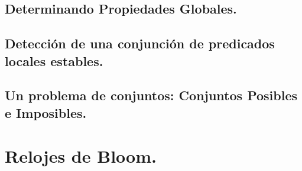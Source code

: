 \documentclass[9pt]{beamer}
\begin{document}
\subsection{Determinando Propiedades Globales.}


\subsection{Detección de una conjunción de predicados locales estables.}


\subsection{Un problema de conjuntos: Conjuntos Posibles e Imposibles.}

\section{Relojes de Bloom.}

\end{document}
